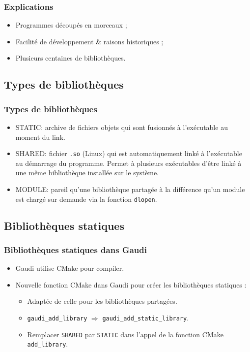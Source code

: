 \documentclass{beamer}
\begin{document}
\begin{frame}[fragile]
    \frametitle{Explications}

    \begin{itemize}
        \item Programmes découpés en morceaux ;
        \item Facilité de développement \& raisons historiques ;
        \item Plusieurs centaines de bibliothèques.
    \end{itemize}
\end{frame}

\subsection{Types de bibliothèques}

\begin{frame}[fragile]
    \frametitle{Types de bibliothèques}

    \begin{itemize}
        \item STATIC: archive de fichiers objets qui sont fusionnés à l'exécutable au moment du link.
        \item SHARED: fichier \verb'.so' (Linux) qui est automatiquement linké à l'exécutable au démarrage du programme.
              Permet à plusieurs exécutables d'être linké à une même bibliothèque installée sur le système.
        \item MODULE: pareil qu'une bibliothèque partagée à la différence qu'un module est chargé sur demande via la fonction \verb'dlopen'.
    \end{itemize}
\end{frame}

\subsection{Bibliothèques statiques}

\begin{frame}[fragile]
    \frametitle{Bibliothèques statiques dans Gaudi}

    \begin{itemize}
        \item Gaudi utilise CMake pour compiler.
        \item Nouvelle fonction CMake dans Gaudi pour créer les bibliothèques statiques :
              \begin{itemize}
                  \item Adaptée de celle pour les bibliothèques partagées.
                  \item \verb'gaudi_add_library' $\Rightarrow$ \verb'gaudi_add_static_library'.
                  \item Remplacer \verb'SHARED' par \verb'STATIC' dans l'appel de la fonction CMake \verb'add_library'.
              \end{itemize}
    \end{itemize}
\end{frame}
\end{document}
